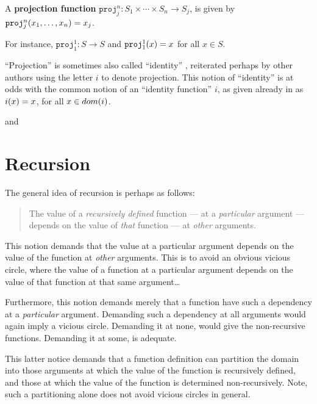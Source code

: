 \begin{definition} A \textbf{projection function} $\mathtt{proj}^n_j : S_1
\times \cdots \times S_n \rightarrow S_j$, is given by
$\mathtt{proj}^n_j{\mathopen{}\left({x_1,\ldots,x_n}\right)\mathclose{}} = x_j$. \end{definition}

For instance, $\mathtt{proj}^1_1 : S \rightarrow S$ and $\mathtt{proj}^1_1{\mathopen{}\left({x}\right)\mathclose{}}
= x$ for all $x \in S$.

\begin{remark} ``Projection'' is sometimes also called ``identity''
\cite{kleene-1936, robinson-1947, odifreddi-1989, lewis-papadimitriou-1998},
reiterated perhaps by other authors using the letter $i$ to denote
projection\cite{rose-1984}. This notion of ``identity'' is at odds with the
common notion of an ``identity function'' $i$, as given already in
\cite{dedekind-1888} as $i{\mathopen{}\left({x}\right)\mathclose{}} = x$, for all $x \in dom{\mathopen{}\left({i}\right)\mathclose{}}$.\end{remark}

 and 

\section{Recursion}

The general idea of recursion is perhaps as follows:

\begin{quote}

The value of a \emph{recursively defined} function --- at a \emph{particular}
argument --- depends on the value of \emph{that} function --- at \emph{other}
arguments.

\end{quote}

This notion demands that the value at a particular argument depends on the
value of the function at \emph{other} arguments. This is to avoid an obvious
vicious circle, where the value of a function at a particular argument depends
on the value of that function at that same argument\ldots

Furthermore, this notion demands merely that a function have such a dependency
at a \emph{particular} argument. Demanding such a dependency at all arguments
would again imply a vicious circle. Demanding it at none, would give the
non-recursive functions. Demanding it at some, is adequate.

This latter notice demands that a function definition can partition the domain
into those arguments at which the value of the function is recursively defined,
and those at which the value of the function is determined non-recursively.
Note, such a partitioning alone does not avoid vicious circles in general.

